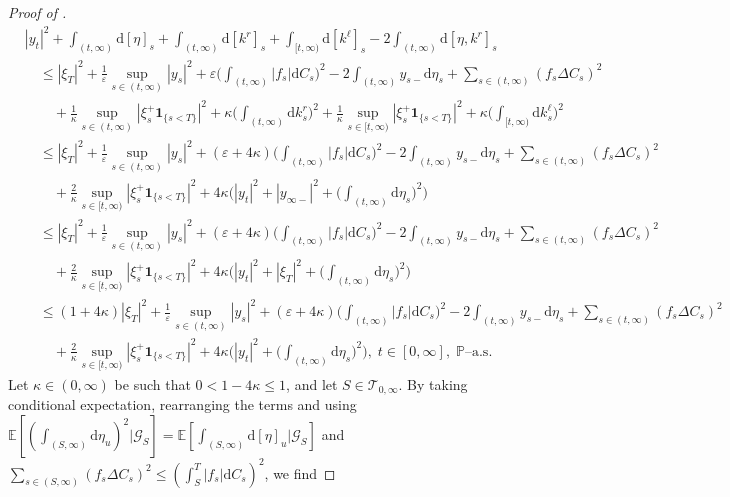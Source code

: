 \documentclass[10pt]{article} %
\newcommand\cG{\mathcal G}
\newcommand\cT{\mathcal T}
\def \E{\mathbb{E}}
\def \P{\mathbb{P}}
\newcommand{\1}{\mathbf{1}}
\def\d{\mathrm{d}}
\begin{document}
\begin{proof}[Proof of ]
\begin{align}\label{eq::inequality_pathwise_without_delta}
	&|y_t|^2 + \int_{(t,\infty)}\d[\eta]_s + \int_{(t,\infty)}\d[k^r]_s + \int_{[t,\infty)} \d[k^\ell]_s - 2\int_{(t,\infty)}\d[\eta, k^r]_s \nonumber\\ 
	&\quad \leq |\xi_T|^2 + \frac{1}{\varepsilon}\sup_{s \in (t,\infty)} |y_s|^2 + \varepsilon\bigg(\int_{(t,\infty)} |f_s| \d C_s\bigg)^2 - 2 \int_{(t,\infty)} y_{s-} \d\eta_s + \sum_{s \in (t,\infty)} (f_s\Delta C_s)^2 \nonumber\\
	&\quad\quad + \frac{1}{\kappa} \sup_{s \in (t,\infty)} |\xi^+_s\mathbf{1}_{\{s < T\}}|^2  + \kappa \bigg(\int_{(t,\infty)} \d k^r_s \bigg)^2 + \frac{1}{\kappa} \sup_{s \in [t,\infty)} |\xi^+_s \mathbf{1}_{\{s < T\}}|^2  + \kappa \bigg(\int_{[t,\infty)} \d k^\ell_s \bigg)^2 \nonumber\\
	&\quad \leq |\xi_T|^2 + \frac{1}{\varepsilon}\sup_{s \in (t,\infty)} |y_s|^2 +(\varepsilon+4\kappa)\bigg(\int_{(t,\infty)} |f_s| \d C_s\bigg)^2 - 2 \int_{(t,\infty)} y_{s-} \d\eta_s + \sum_{s \in (t,\infty)} (f_s\Delta C_s)^2 \nonumber\\
	&\quad\quad + \frac{2}{\kappa} \sup_{s \in [t,\infty)} |\xi^+_s\mathbf{1}_{\{s < T\}}|^2 + 4\kappa \bigg( |y_t|^2 + |y_{\infty-}|^2 + \bigg(\int_{(t,\infty)} \d \eta_s\bigg)^2 \bigg) \nonumber\\
	&\quad \leq |\xi_T|^2 + \frac{1}{\varepsilon}\sup_{s \in (t,\infty)} |y_s|^2 +(\varepsilon+4\kappa)\bigg(\int_{(t,\infty)} |f_s| \d C_s\bigg)^2 - 2 \int_{(t,\infty)} y_{s-} \d\eta_s + \sum_{s \in (t,\infty)} (f_s\Delta C_s)^2 \nonumber\\
	&\quad\quad + \frac{2}{\kappa} \sup_{s \in [t,\infty)} |\xi^+_s\mathbf{1}_{\{s < T\}}|^2 + 4\kappa \bigg( |y_t|^2 + |\xi_T|^2 + \bigg(\int_{(t,\infty)} \d \eta_s\bigg)^2 \bigg) \nonumber\\
	&\quad \leq (1+4\kappa)|\xi_T|^2 + \frac{1}{\varepsilon}\sup_{s \in (t,\infty)} |y_s|^2 +(\varepsilon+4\kappa)\bigg(\int_{(t,\infty)} |f_s| \d C_s\bigg)^2 - 2 \int_{(t,\infty)} y_{s-} \d\eta_s + \sum_{s \in (t,\infty)} (f_s\Delta C_s)^2 \nonumber\\
	&\quad\quad + \frac{2}{\kappa} \sup_{s \in [t,\infty)} |\xi^+_s\mathbf{1}_{\{s < T\}}|^2 + 4\kappa \bigg( |y_t|^2 + \bigg(\int_{(t,\infty)} \d \eta_s\bigg)^2 \bigg), \; t \in [0,\infty], \; \text{$\P$--a.s.}
\end{align}
Let $\kappa \in (0,\infty)$ be such that $0 < 1-4\kappa \leq 1$, and let $S \in \cT_{0,\infty}$. By taking conditional expectation, rearranging the terms and using $\E[(\int_{(S,\infty)}\d\eta_u)^2|\cG_S] = \E[\int_{(S,\infty)}\d[\eta]_u|\cG_S]$ and $\sum_{s \in (S,\infty)} (f_s\Delta C_s)^2 \leq (\int_S^T |f_s| \d C_s)^2$, we find

\end{proof}
\end{document}
